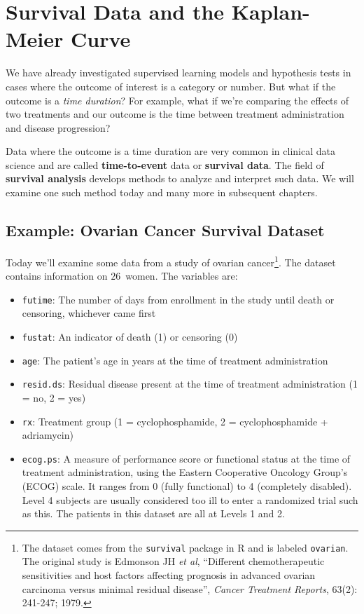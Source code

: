 \chapter{Survival Data and the Kaplan-Meier Curve \label{chapter:km}}

We have already investigated supervised learning models and hypothesis tests in cases where the outcome of interest is a category or number. But what if the outcome is a \emph{time duration}? For example, what if we're comparing the effects of two treatments and our outcome is the time between treatment administration and disease progression?

Data where the outcome is a time duration are very common in clinical data science and are called \textbf{time-to-event} data or \textbf{survival data}. The field of \textbf{survival analysis} develops methods to analyze and interpret such data. We will examine one such method today and many more in subsequent chapters.


\section{Example: Ovarian Cancer Survival Dataset}

Today we'll examine some data from a study of ovarian cancer\footnote{The dataset comes from the \texttt{survival} package in R and is labeled \texttt{ovarian}. The original study is Edmonson JH \emph{et al}, ``Different chemotherapeutic sensitivities and host factors affecting prognosis in advanced ovarian carcinoma versus minimal residual disease'', \emph{Cancer Treatment Reports}, 63(2): 241-247; 1979.}. The dataset contains information on $26$~women. The variables are:

{\small
\begin{itemize}
\item \texttt{futime}: The number of days from enrollment in the study until death or censoring, whichever came first
\item \texttt{fustat}: An indicator of death (1) or censoring (0)
\item \texttt{age}: The patient's age in years at the time of treatment administration
\item \texttt{resid.ds}: Residual disease present at the time of treatment administration (1 = no, 2 = yes)
\item \texttt{rx}: Treatment group (1 = cyclophosphamide, 2 = cyclophosphamide + adriamycin)
\item \texttt{ecog.ps}: A measure of performance score or functional status at the time of treatment administration, using the Eastern Cooperative Oncology Group's (ECOG) scale. It ranges from 0 (fully functional) to 4 (completely disabled). Level 4 subjects are usually considered too ill to enter a randomized trial such as this. The patients in this dataset are all at Levels 1 and 2. 
\end{itemize}
}

